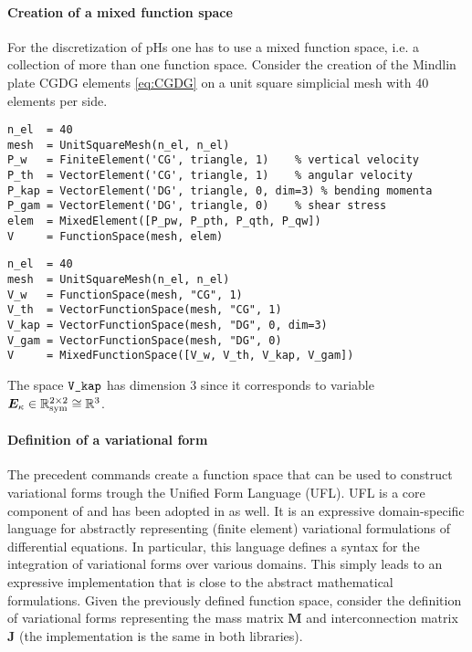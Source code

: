 \paragraph{Creation of a mixed function space}
For the discretization of pHs one has to use a mixed function space, i.e. a collection of more than one function space. Consider the creation of the Mindlin plate CGDG elements \eqref{eq:CGDG} on a unit square simplicial mesh with 40 elements per side.
\begin{tcolorbox}[title = Mixed function space in  \fenics, coltitle=black, breakable, size=fbox, boxrule=1pt, pad at break*=1mm, colframe=red, enlarge top by=0.25em, enlarge bottom by=0.5em]
\begin{Verbatim}[tabsize=4]
n_el  = 40
mesh  = UnitSquareMesh(n_el, n_el)
P_w   = FiniteElement('CG', triangle, 1)   	% vertical velocity
P_th  = VectorElement('CG', triangle, 1)   	% angular velocity
P_kap = VectorElement('DG', triangle, 0, dim=3)	% bending momenta			
P_gam = VectorElement('DG', triangle, 0)	% shear stress 
elem  = MixedElement([P_pw, P_pth, P_qth, P_qw])
V     = FunctionSpace(mesh, elem)
\end{Verbatim}
\end{tcolorbox}
\begin{tcolorbox}[title = Mixed function space in  \firedrake, coltitle=black, breakable, size=fbox, boxrule=1pt, pad at break*=1mm, colframe=cyan, enlarge top by=0.25em, enlarge bottom by=0.5em]
\begin{Verbatim}[tabsize=4]
n_el  = 40
mesh  = UnitSquareMesh(n_el, n_el)
V_w   = FunctionSpace(mesh, "CG", 1)
V_th  = VectorFunctionSpace(mesh, "CG", 1)
V_kap = VectorFunctionSpace(mesh, "DG", 0, dim=3)
V_gam = VectorFunctionSpace(mesh, "DG", 0)
V     = MixedFunctionSpace([V_w, V_th, V_kap, V_gam])
\end{Verbatim}
\end{tcolorbox}
The space $\verb|V_kap|$ has dimension 3 since it corresponds to variable $\bm{E}_\kappa \in \mathbb{R}^{2\times 2}_{\text{sym}} \cong  \mathbb{R}^3$.

\paragraph{Definition of a variational form}
The precedent commands create a function space that can be used to construct variational forms trough the Unified Form Language \cite{alnaes2014} (UFL). UFL is a core component of \fenics and has been adopted in \firedrake as well. It is an expressive domain-specific language for abstractly representing (finite element) variational formulations of differential equations. In particular, this language defines a syntax for the integration of variational forms over various domains. This simply leads to an expressive implementation that is close to the abstract mathematical formulations. Given the previously defined function space, consider the definition of variational forms representing the mass matrix $\mathbf{M}$ and interconnection matrix $\mathbf{J}$ (the implementation is the same in both libraries).
 
